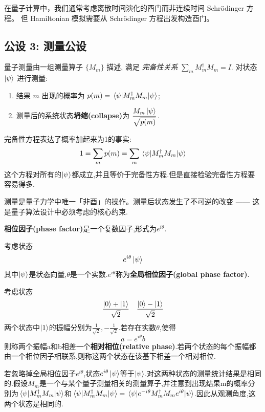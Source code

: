 \documentclass[utf8]{article} %
\numberwithin{equation}{section}   %
\newtheorem{Def}{\hskip 2em {\color{green} 定义}}[subsection]
\newtheorem{Thm}{\hskip 2em {\color{blue} 定理}}[subsection]
\newtheorem{Note}{\hskip 2em {\color{red} 注}}[subsection]
\begin{document}
\begin{Note}
    在量子计算中，我们通常考虑离散时间演化的酉门而非连续时间 Schrödinger 方程。
    但 Hamiltonian 模拟需要从 Schrödinger 方程出发构造酉门。
\end{Note}

\subsection{公设 3: 测量公设}

\begin{Thm}
    量子测量由一组测量算子 $\{M_m\}$ 描述, 满足 \emph{完备性关系} $\sum_m M_m^\dagger M_m = I$.
    对状态 $\ket{\psi}$ 进行测量: 
    \begin{enumerate}
        \item 结果 $m$ 出现的概率为 $p(m) = \mel{\psi}{M_m^\dagger M_m}{\psi}$;
        \item 测量后的系统状态\textbf{坍缩(collapse)}为 $\displaystyle\frac{M_m \ket{\psi}}{\sqrt{p(m)}}$.
    \end{enumerate}
\end{Thm}

完备性方程表达了概率加起来为1的事实:
	\[ 1=\sum_{m}p(m)=\sum_{m}\mel{\psi}{M_m^\dagger M_m}{\psi} \]
这个方程对所有的$\ket{\psi}$都成立,并且等价于完备性方程.但是直接检验完备性方程要容易得多.

\begin{Note}
    测量是量子力学中唯一「非酉」的操作。测量后状态发生了不可逆的改变 ——
    这是量子算法设计中必须考虑的核心约束.
\end{Note}

\begin{Def}
	\textbf{相位因子(phase factor)}是一个复数因子,形式为$e^{i \theta}$.\par 
	考虑状态
	\[ e^{i \theta}\ket{\psi} \]
	其中$\ket{\psi}$是状态向量,$\theta$是一个实数.$e^{i \theta}$称为\textbf{全局相位因子(global phase factor)}.\par 
	考虑状态
	\[ \frac{\ket{0}+\ket{1}}{\sqrt{2}}\quad \frac{\ket{0}-\ket{1}}{\sqrt{2}} \]
	两个状态中$\ket{1}$的振幅分别为$\frac{1}{\sqrt{2}},-\frac{1}{\sqrt{2}}$.若存在实数$\theta$,使得
	\[ a=e^{i \theta}b \]
	则称两个振幅a和b相差一个\textbf{相对相位(relative phase)}.若两个状态的每个振幅都由一个相位因子相联系,则称这两个状态在该基下相差一个相对相位.
\end{Def}
\begin{Note}
	若忽略掉全局相位因子$e^{i \theta}$,状态$e^{i \theta}\ket{\psi}$等于$\ket{\psi}$.对这两种状态的测量统计结果是相同的.假设$M_m$是一个与某个量子测量相关的测量算子,并注意到出现结果m的概率分别为$\mel{\psi}{M_m^\dagger M_m}{\psi}$和$\mel{\psi}{M_m^\dagger M_m}{\psi}=\mel{\psi}{e^{-i \theta}M_m^\dagger M_me^{i \theta}}{\psi}$.因此从观测角度,这两个状态是相同的.
\end{Note}
\end{document}
